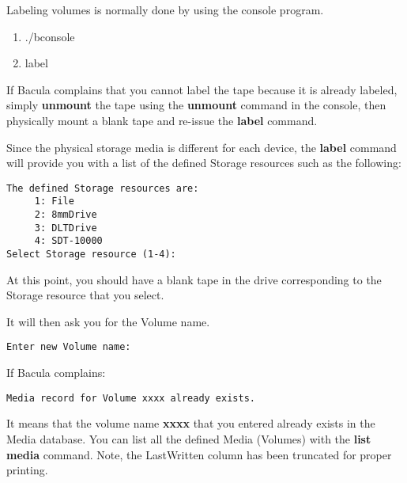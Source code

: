 Labeling volumes is normally done by using the console program. 

\begin{enumerate}
\item ./bconsole  
\item label 
   \end{enumerate}

If Bacula complains that you cannot label the tape because it is already
labeled, simply {\bf unmount} the tape using the {\bf unmount} command in the
console, then physically mount a blank tape and re-issue the {\bf label}
command. 

Since the physical storage media is different for each device, the {\bf label}
command will provide you with a list of the defined Storage resources such as
the following: 

\footnotesize
\begin{verbatim}
The defined Storage resources are:
     1: File
     2: 8mmDrive
     3: DLTDrive
     4: SDT-10000
Select Storage resource (1-4):
\end{verbatim}
\normalsize

At this point, you should have a blank tape in the drive corresponding to the
Storage resource that you select. 

It will then ask you for the Volume name. 

\footnotesize
\begin{verbatim}
Enter new Volume name:
\end{verbatim}
\normalsize

If Bacula complains: 

\footnotesize
\begin{verbatim}
Media record for Volume xxxx already exists.
\end{verbatim}
\normalsize

It means that the volume name {\bf xxxx} that you entered already exists in
the Media database. You can list all the defined Media (Volumes) with the {\bf
list media} command. Note, the LastWritten column has been truncated for
proper printing. 

